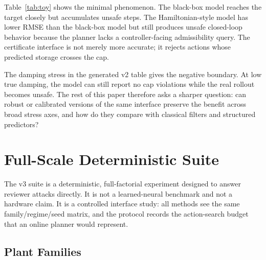 \documentclass{article}
\begin{document}
Table~\ref{tab:toy} shows the minimal phenomenon. The black-box model reaches the target closely but accumulates unsafe steps. The Hamiltonian-style model has lower RMSE than the black-box model but still produces unsafe closed-loop behavior because the planner lacks a controller-facing admissibility query. The certificate interface is not merely more accurate; it rejects actions whose predicted storage crosses the cap.



The damping stress in the generated v2 table gives the negative boundary. At low true damping, the model can still report no cap violations while the real rollout becomes unsafe. The rest of this paper therefore asks a sharper question: can robust or calibrated versions of the same interface preserve the benefit across broad stress axes, and how do they compare with classical filters and structured predictors?

\section{Full-Scale Deterministic Suite}

The v3 suite is a deterministic, full-factorial experiment designed to answer reviewer attacks directly. It is not a learned-neural benchmark and not a hardware claim. It is a controlled interface study: all methods see the same family/regime/seed matrix, and the protocol records the action-search budget that an online planner would represent.

\begin{table}[t]
\centering
\small
\caption{Full-scale protocol. Candidate rollouts are represented by families, regimes, methods, seeds, horizon, candidate actions, and lookahead. The stored data are RAM-light: seed metrics, aggregate metrics, one representative trace, and vector figures.}
\label{tab:scale}
\end{table}

\subsection{Plant Families}
\end{document}
